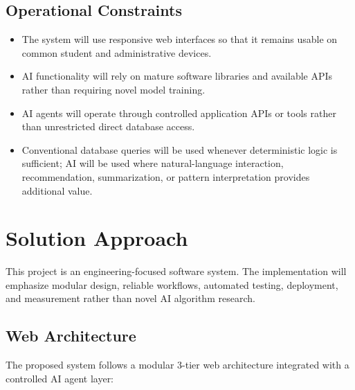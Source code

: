 \documentclass[11pt]{article}
\begin{document}
\subsection{Operational Constraints}
\begin{itemize}
    \item The system will use responsive web interfaces so that it remains usable on common student and administrative devices.
    \item AI functionality will rely on mature software libraries and available APIs rather than requiring novel model training.
    \item AI agents will operate through controlled application APIs or tools rather than unrestricted direct database access.
    \item Conventional database queries will be used whenever deterministic logic is sufficient; AI will be used where natural-language interaction, recommendation, summarization, or pattern interpretation provides additional value.
\end{itemize}

\section{Solution Approach}
This project is an engineering-focused software system. The implementation will emphasize modular design, reliable workflows, automated testing, deployment, and measurement rather than novel AI algorithm research.

\subsection{Web Architecture}
The proposed system follows a modular 3-tier web architecture integrated with a controlled AI agent layer:
\end{document}
